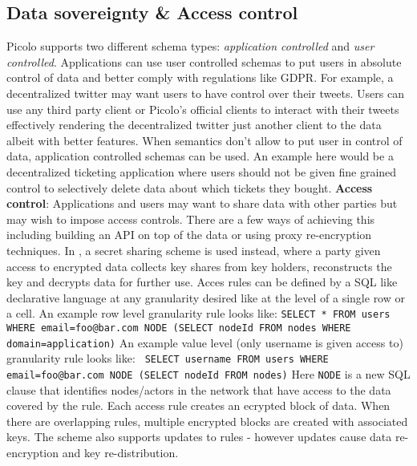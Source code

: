 \subsection{Data sovereignty \& Access control} \label{sec:access_control}
Picolo supports two different schema types: \textit{application controlled} and \textit{user controlled}. Applications can use user controlled schemas to put users in absolute control of data and better comply with regulations like GDPR. For example, a decentralized twitter may  want users to have control over their tweets. Users can use any third party client or Picolo's official clients to interact with their tweets effectively rendering the decentralized twitter just another client to the data albeit with better features. \newline\newline
When semantics don't allow to put user in control of data, application controlled schemas can be used. An example here would be a decentralized ticketing application where users should not be given fine grained control to selectively delete data about which tickets they bought.
\newline\newline
\textbf{Access control}:
Applications and users may want to share data with other parties but may wish to impose access controls. There are a few ways of achieving this including building an API on top of the data or using proxy re-encryption techniques. In \cite{ac_p2p_db}, a secret sharing scheme is used instead, where a party given access to encrypted data collects key shares from key holders, reconstructs the key and decrypts data for further use. Acces rules can be defined by a SQL like declarative language at any granularity desired like at the level of a single row or a cell. An example row level granularity rule looks like:\newline \newline
\texttt{SELECT  * \newline FROM users \newline WHERE email=foo@bar.com \newline NODE (SELECT nodeId FROM nodes WHERE domain=application)} \newline \newline
An example value level (only username is given access to) granularity rule looks like:\newline \newline
\texttt{ SELECT username \newline FROM users \newline WHERE email=foo@bar.com \newline NODE (SELECT nodeId FROM nodes)}\newline\newline
Here \texttt{NODE} is a new SQL clause that identifies nodes/actors in the network that have access to the data covered by the rule. Each access rule creates an ecrypted block of data. When there are overlapping rules, multiple encrypted blocks are created with associated keys. The scheme also supports updates to rules - however updates cause data re-encryption and key re-distribution. 

